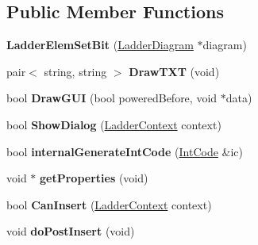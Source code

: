 \subsection*{Public Member Functions}
\begin{DoxyCompactItemize}
\item 
\hypertarget{class_ladder_elem_set_bit_abd394b351d25acbbcf24d87b7fe64ea6}{{\bfseries Ladder\-Elem\-Set\-Bit} (\hyperlink{class_ladder_diagram}{Ladder\-Diagram} $\ast$diagram)}\label{class_ladder_elem_set_bit_abd394b351d25acbbcf24d87b7fe64ea6}

\item 
\hypertarget{class_ladder_elem_set_bit_a223b235a409fe56eb633a678d322c9dd}{pair$<$ string, string $>$ {\bfseries Draw\-T\-X\-T} (void)}\label{class_ladder_elem_set_bit_a223b235a409fe56eb633a678d322c9dd}

\item 
\hypertarget{class_ladder_elem_set_bit_a5910294bfeff7af1066c5acd4bf3b809}{bool {\bfseries Draw\-G\-U\-I} (bool powered\-Before, void $\ast$data)}\label{class_ladder_elem_set_bit_a5910294bfeff7af1066c5acd4bf3b809}

\item 
\hypertarget{class_ladder_elem_set_bit_abe91e2b71e4c7c4215d0f3504ec6b98c}{bool {\bfseries Show\-Dialog} (\hyperlink{struct_ladder_context}{Ladder\-Context} context)}\label{class_ladder_elem_set_bit_abe91e2b71e4c7c4215d0f3504ec6b98c}

\item 
\hypertarget{class_ladder_elem_set_bit_a57445938db5175af04230b363c6f7511}{bool {\bfseries internal\-Generate\-Int\-Code} (\hyperlink{class_int_code}{Int\-Code} \&ic)}\label{class_ladder_elem_set_bit_a57445938db5175af04230b363c6f7511}

\item 
\hypertarget{class_ladder_elem_set_bit_a64d64a13c0aaf8157c6d4e64e88e8f33}{void $\ast$ {\bfseries get\-Properties} (void)}\label{class_ladder_elem_set_bit_a64d64a13c0aaf8157c6d4e64e88e8f33}

\item 
\hypertarget{class_ladder_elem_set_bit_ae6353b6f2abcf1065f821fb24cc6c48a}{bool {\bfseries Can\-Insert} (\hyperlink{struct_ladder_context}{Ladder\-Context} context)}\label{class_ladder_elem_set_bit_ae6353b6f2abcf1065f821fb24cc6c48a}

\item 
\hypertarget{class_ladder_elem_set_bit_a05f83b6188d8b3a94dba591735218dc9}{void {\bfseries do\-Post\-Insert} (void)}\label{class_ladder_elem_set_bit_a05f83b6188d8b3a94dba591735218dc9}


\end{DoxyCompactItemize}
